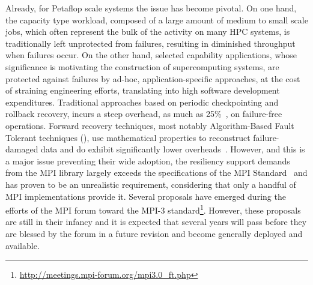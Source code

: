 Already, for Petaflop scale systems the issue has become pivotal. On one hand,
the capacity type workload, composed of a large amount of medium to small
scale jobs, which often represent the bulk of the activity on many HPC systems,
is traditionally left unprotected from failures, resulting in diminished
throughput when failures occur. On the other hand, selected capability applications,
whose significance is motivating the construction of supercomputing systems, are
protected against failures by ad-hoc, application-specific approaches, at the
cost of straining engineering efforts, translating into high software development
expenditures.
Traditional approaches based on periodic checkpointing and rollback recovery,
incurs a steep overhead, as much as 25\%~\cite{Schroeder:2007tp}, on
failure-free operations. Forward recovery techniques, most notably
Algorithm-Based Fault Tolerant techniques (\abft), use mathematical properties 
to reconstruct failure-damaged data and do exhibit
significantly lower overheads~\cite{luk1988analysis}. However, and this is a major issue preventing
their wide adoption, the resiliency support \abft demands from the MPI library
largely exceeds the specifications of the MPI Standard~\cite{MPI30} and has
proven to be an unrealistic requirement, considering that only a handful of MPI
implementations provide it.
%
Several proposals have emerged during the efforts of the MPI forum 
toward the MPI-3 standard\footnote{\url{http://meetings.mpi-forum.org/mpi3.0_ft.php}}.
However, these proposals are still in their infancy and it is expected 
that several years will pass before they are blessed by the forum in a future 
revision and become generally deployed and available. 

